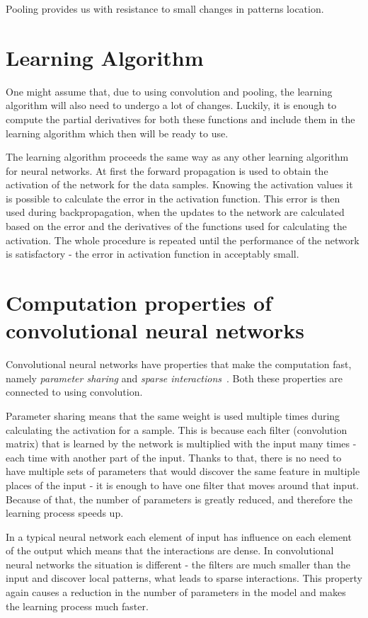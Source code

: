 \documentclass[a4paper,10pt]{report}
\begin{document}
	  Pooling provides us with resistance to small changes in patterns location.
  	  
      
      \section{Learning Algorithm}
      One might assume that, due to using convolution and pooling, the learning algorithm will also need to undergo a lot of changes. Luckily, it is enough to compute the partial derivatives for both these functions and include them in the learning algorithm which then will be ready to use.
      
      The learning algorithm proceeds the same way as any other learning algorithm for neural networks. At first the forward propagation is used to obtain the activation of the network for the data samples. Knowing the activation values it is possible to calculate the error in the activation function. This error is then used during backpropagation, when the updates to the network are calculated based on the error and the derivatives of the functions used for calculating the activation. The whole procedure is repeated until the performance of the network is satisfactory - the error in activation function in acceptably small.
      
       \section{Computation properties of convolutional neural networks}
      	  Convolutional neural networks have properties that make the computation fast, namely \emph{parameter sharing} and \emph{sparse interactions}~\cite{Bengio}. Both these properties are connected to using convolution. 
	  
	  Parameter sharing means that the same weight is used multiple times during calculating the activation for a sample. This is because each filter (convolution matrix) that is learned by the network is multiplied with the input many times - each time with another part of the input. Thanks to that, there is no need to have multiple sets of parameters that would discover the same feature in multiple places of the input - it is enough to have one filter that moves around that input. Because of that, the number of parameters is greatly reduced, and therefore the learning process speeds up. 
	  
	  In a typical neural network each element of input has influence on each element of the output which means that the interactions are dense. In convolutional neural networks the situation is different - the filters are much smaller than the input and discover local patterns, what leads to sparse interactions. This property again causes a reduction in the number of parameters in the model and makes the learning process much faster.
	
\end{document}
